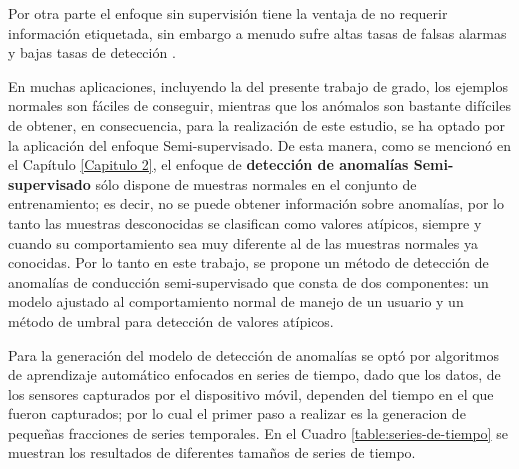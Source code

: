\vspace{5mm} %

Por otra parte el enfoque sin supervisi\'{o}n tiene la ventaja de no requerir informaci\'{o}n etiquetada, sin embargo a menudo sufre altas tasas de falsas alarmas y bajas tasas de detecci\'{o}n \cite{33}. 

\vspace{5mm} %

En muchas aplicaciones, incluyendo la del presente trabajo de grado, los ejemplos normales son f\'{a}ciles de conseguir, mientras que los an\'{o}malos son bastante dif\'{i}ciles de obtener, en consecuencia, para la realizaci\'{o}n de este estudio, se ha optado por la aplicaci\'{o}n del enfoque Semi-supervisado. De esta manera, como se mencion\'{o} en el Cap\'{i}tulo \ref{Capitulo 2}, el enfoque de \textbf{detecci\'{o}n de anomal\'{i}as Semi-supervisado} s\'{o}lo dispone de muestras normales en el conjunto de entrenamiento; es decir, no se puede obtener informaci\'{o}n sobre anomal\'{i}as, por lo tanto las muestras desconocidas se clasifican como valores at\'{i}picos, siempre y cuando su comportamiento sea muy diferente al de las muestras normales ya conocidas. Por lo tanto en este trabajo, se propone un m\'{e}todo de detecci\'{o}n de anomal\'{i}as de conducci\'{o}n semi-supervisado que consta de dos componentes: un modelo ajustado al comportamiento normal de manejo de un usuario y un m\'{e}todo de umbral para detecci\'{o}n de valores at\'{i}picos.

\vspace{5mm} %

Para la generaci\'{o}n del modelo de detecci\'{o}n de anomal\'{i}as se opt\'{o} por algoritmos de aprendizaje autom\'{a}tico enfocados en series de tiempo, dado que los datos, de los sensores capturados por el dispositivo m\'{o}vil, dependen del tiempo en el que fueron capturados; por lo cual el primer paso a realizar es la generacion de peque\~{n}as fracciones de series temporales. En el Cuadro \ref{table:series-de-tiempo} se muestran los resultados de diferentes tama\~{n}os de series de tiempo.


